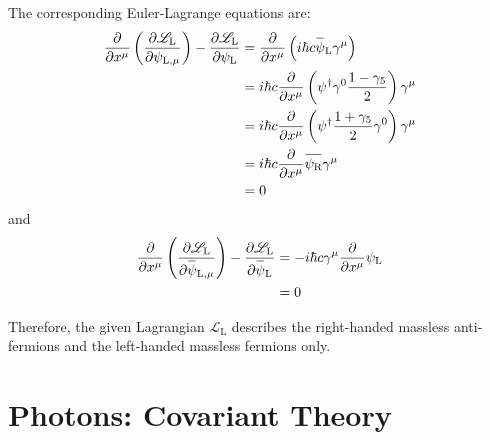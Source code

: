 \documentclass[letterpaper,12pt]{article}
\newenvironment{problem}{\subsection{}\begin{adjustwidth}{0.25in}{}\vspace{-\baselineskip}}{\end{adjustwidth}}
\newcommand{\pder}[2]{\frac{\partial #1}{\partial #2}}
\newcommand{\lagr}{\mathscr{L}}
\newcommand{\overbar}[1]{
	\mkern 1.5mu \overline{\mkern-1.5mu\raisebox{0pt}[\dimexpr\height+0.5mm\relax]{$#1$}\mkern-1.5mu}\mkern 1.5mu
}
\begin{document}
\begin{problem}
The corresponding Euler-Lagrange equations are:
\begin{align*}
	\pder{}{x^\mu}\left(\pder{\lagr_\text{L}}{\psi_{\text{L},\mu}}\right) - \pder{\lagr_\text{L}}{\psi_\text{L}}
	&= \pder{}{x^\mu} \left(i\hbar c \overbar{\psi}_\text{L} \gamma^\mu\right)	\\
	&= i\hbar c \pder{}{x^\mu} \left(\psi^\dagger \gamma^0 \frac{1-\gamma_5}{2}\right)\gamma^\mu	\\
	&= i\hbar c \pder{}{x^\mu} \left(\psi^\dagger \frac{1+\gamma_5}{2}\gamma^0\right) \gamma^\mu	\\
	&= i\hbar c \pder{}{x^\mu} \overbar{\psi_\text{R}} \gamma^\mu	\\
	&= 0
\end{align*}
and
\begin{align*}
	\pder{}{x^\mu}\left(\pder{\lagr_\text{L}}{\overbar{\psi}_{\text{L},\mu}}\right) - \pder{\lagr_\text{L}}{\overbar{\psi}_\text{L}}
	&= - i\hbar c \gamma^\mu \pder{}{x^\mu} \psi_\text{L}	\\
	&= 0
\end{align*}

Therefore, the given Lagrangian $\lagr_\text{L}$ describes the right-handed massless anti-fermions and the left-handed massless fermions only.	
\end{problem}



\section{Photons: Covariant Theory}
\end{document}
